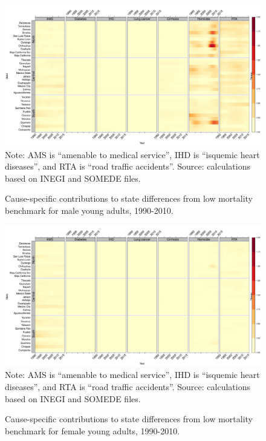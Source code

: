 \documentclass[11.5pt]{article}
\begin{document}
{\begin{figure}
\centering
\caption{Cause-specific contributions to state differences from low mortality benchmark for male young adults, 1990-2010.}
\label{fig:e15_39_males}
\includegraphics[scale=.3]{YoungAdult_Male_heatmap.pdf}
Note: AMS is ``amenable to medical service'', IHD is ``isquemic heart diseases'', and RTA is ``road traffic accidents''. Source: calculations based on INEGI and SOMEDE files.
\end{figure}

\begin{figure}
\centering
\caption{Cause-specific contributions to state differences from low mortality benchmark for female young adults, 1990-2010.}
\label{fig:e15_39_females}
\includegraphics[scale=.3]{YoungAdult_Female_heatmap.pdf}
Note: AMS is ``amenable to medical service'', IHD is ``isquemic heart diseases'', and RTA is ``road traffic accidents''. Source: calculations based on INEGI and SOMEDE files.
\end{figure}

}
\end{document}
